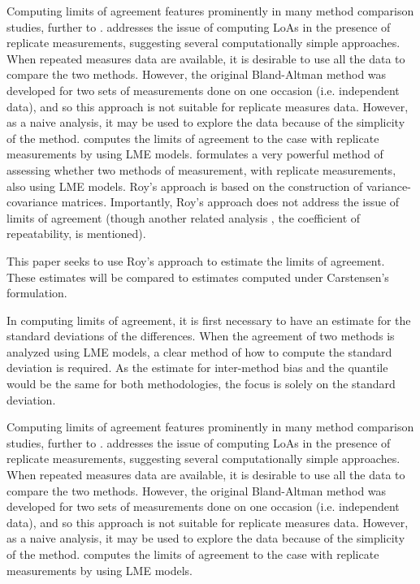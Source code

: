 \documentclass[12pt, a4paper]{report}
\theoremstyle{plain}
\theoremstyle{definition}
\theoremstyle{remark}
\begin{document}
Computing limits of agreement features prominently in many method comparison studies, further to \citet{BA86,BA99}.
\citet{BA99} addresses the issue of computing LoAs in the presence of replicate measurements, suggesting several computationally simple approaches. When repeated measures data are available, it is desirable to use
all the data to compare the two methods. However, the original Bland-Altman method was developed for two sets of measurements done on one occasion (i.e. independent data), and so this approach is not suitable for replicate measures data. However, as a naive analysis, it may be used to explore the data because of the simplicity of the method.
\citet{BXC2008}  computes the limits of agreement to the case with replicate measurements by using LME models.
\bigskip
\citet{ARoy2009} formulates a very powerful method of assessing whether two methods of measurement, with replicate measurements, also using LME models. Roy's approach is based on the construction of variance-covariance matrices.
Importantly, Roy's approach does not address the issue of limits of agreement (though another related analysis , the coefficient of repeatability, is mentioned).

This paper seeks to use Roy's approach to estimate the limits of agreement. These estimates will be compared to estimates computed under Carstensen's formulation.

In computing limits of agreement, it is first necessary to have an estimate for the standard deviations of the differences. When the agreement of two methods is analyzed using LME models, a clear method of how to compute the standard deviation is required. As the estimate for inter-method bias and the quantile would be the same for both methodologies, the focus is solely on the standard deviation.

\bigskip
		Computing limits of agreement features prominently in many method comparison studies, further to \citet{BA86,BA99}.
		\citet{BA99} addresses the issue of computing LoAs in the presence of replicate measurements, suggesting several computationally simple approaches. When repeated measures data are available, it is desirable to use
		all the data to compare the two methods. However, the original Bland-Altman method was developed for two sets of measurements done on one occasion (i.e. independent data), and so this approach is not suitable for replicate measures data. However, as a naive analysis, it may be used to explore the data because of the simplicity of the method.
		\citet{BXC2008}  computes the limits of agreement to the case with replicate measurements by using LME models.
		
\end{document}
